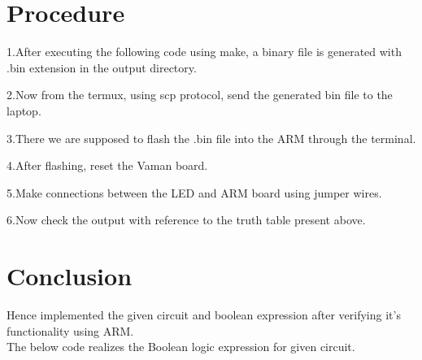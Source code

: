 \documentclass[10pt,twocolumn]{article}
\begin{document}
\section{Procedure}
\raggedright 1.After executing the following code using make, a binary file is generated with .bin extension in the output directory. \vspace{2mm} \\ 
\raggedright 2.Now from the termux, using scp protocol, send the generated bin file to the laptop. \\ \vspace{2mm}
\raggedright 3.There we are supposed to flash the .bin file into the ARM through the terminal.\\ \vspace{2mm}
\raggedright 4.After flashing, reset the Vaman board.\\ \vspace{2mm}
\raggedright 5.Make connections between the LED and ARM board using jumper wires. \\ \vspace{2mm}
\raggedright 6.Now check the output with reference to the truth table present above.

\section{Conclusion}
Hence implemented the given circuit and boolean expression  after verifying it's functionality using ARM.\\
The below code realizes the Boolean logic expression for given 
circuit.
\begin{center}
\end{center}
\end{document}
